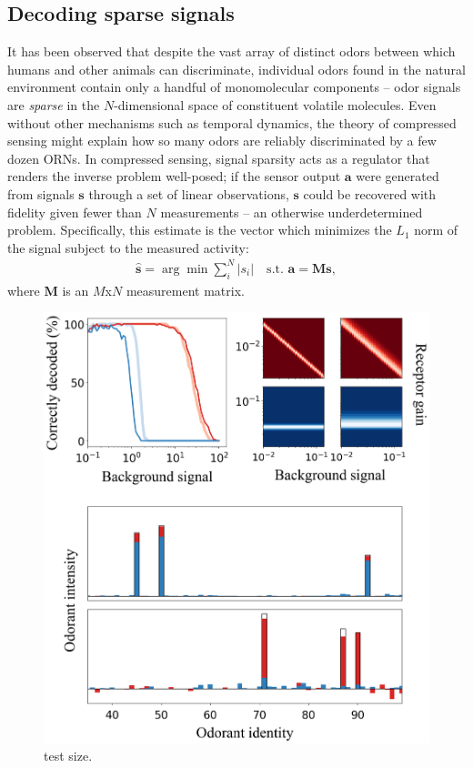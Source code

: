 \documentclass[9pt,twocolumn,twoside]{pnas-new}
\begin{document}
\subsection*{Decoding sparse signals}
It has been observed that despite the vast array of distinct odors between which humans and other animals can discriminate, individual odors found in the natural environment contain only a handful of monomolecular components -- odor signals are \textit{sparse} in the $N$-dimensional space of constituent volatile molecules. Even without other mechanisms such as temporal dynamics, the theory of compressed sensing might explain how so many odors are reliably discriminated by a few dozen ORNs. In compressed sensing, signal sparsity acts as a regulator that renders the inverse problem well-posed; if the sensor output $\mathbf a$ were generated from signals $\mathbf s$ through a set of linear observations, $\mathbf s$ could be recovered with fidelity given fewer than $N$ measurements -- an otherwise underdetermined problem. %
Specifically, this estimate is the vector which minimizes the $L_1$ norm of the signal subject to the measured activity:
\begin{align}
\hat {\mathbf s} = \arg \min \sum_i^N |s_i| \quad \text {s.t.  } \mathbf a = \mathbf M \mathbf s,
\label{eq:compressed_sensing_formulation}
\end{align}
where $\mathbf M$ is an $M$x$N$ measurement matrix.


\begin{figure}%
	\centering
	\includegraphics[width=.8\linewidth]{figures/signal_decoding_weber_law/signal_decoding_weber_law}
	\caption{test size.}
	\label{fig:frog}
\end{figure}
\end{document}
